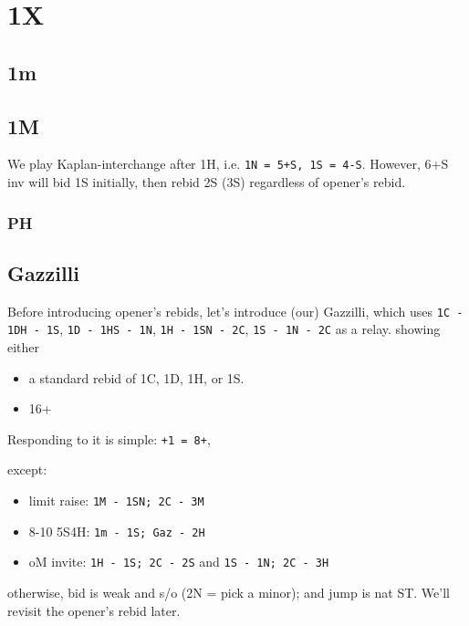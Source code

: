 \section{1X}

\subsection{1m}


\subsection{1M}

We play Kaplan-interchange after 1H, i.e. \texttt{1N = 5+S, 1S = 4-S}.
However, 6+S inv will bid 1S initially, then rebid 2S (3S) regardless of opener's rebid.

\subsubsection{PH}


\subsection{Gazzilli}

Before introducing opener's rebids, let's introduce (our) Gazzilli, which uses 
\texttt{1C - 1DH - 1S}, \texttt{1D - 1HS - 1N}, \texttt{1H - 1SN - 2C}, \texttt{1S - 1N - 2C} as a relay. showing either

\begin{itemize}
    \setlength\itemsep{0pt}
    \item a standard rebid of {1C, 1D, 1H, or 1S}.
    \item 16+
\end{itemize}

Responding to it is simple: \texttt{+1 = 8+}, {\color{blue} except:
\begin{itemize}
    \setlength\itemsep{0pt}
    \item limit raise: \texttt{1M - 1SN; 2C - 3M}
    \item 8-10 5S4H: \texttt{1m - 1S; Gaz - 2H}
    \item oM invite: \texttt{1H - 1S; 2C - 2S} and \texttt{1S - 1N; 2C - 3H}
\end{itemize}}
otherwise, bid is weak and s/o (2N = pick a minor); and {\color{blue} jump is nat ST}. We'll revisit the opener's rebid later.


